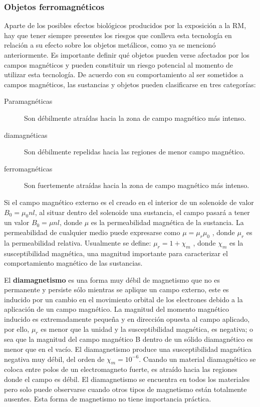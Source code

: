 \subsubsection{Objetos ferromagnéticos}
Aparte de los posibles efectos biológicos producidos por la exposición a la RM, hay que tener siempre presentes los riesgos que conlleva esta tecnología en relación a su efecto sobre los objetos metálicos, como ya se mencionó anteriormente.  Es importante definir qué objetos pueden verse afectados por los campos magnéticos y pueden constituir un riesgo potencial al momento de utilizar esta tecnología. De acuerdo con su comportamiento al ser sometidos a campos magnéticos, las sustancias y objetos pueden clasificarse en tres categorías:
\begin{description}
 \item [Paramagnéticas] Son débilmente atraídas hacia la zona de campo magnético más intenso.
 \item [diamagnéticas] Son débilmente repelidas hacia las regiones de menor campo magnético. 
 \item [ferromagnéticas] Son fuertemente atraídas hacia la zona de campo magnético más intenso. 
\end{description}



Si el campo magnético externo es el creado en el interior de un solenoide de valor $B_0 = \mu_0 nl$, al situar dentro del solenoide una sustancia, el campo pasará a tener un valor $B_0 = \mu nl$, donde $\mu$ es la permeabilidad magnética de la sustancia. La permeabilidad de cualquier medio puede expresarse como $\mu = \mu_r \mu_0$ , donde $\mu_r$ es la permeabilidad relativa. Usualmente se define: $\mu_r = 1 + \chi_m$ , donde $\chi_m$ es la susceptibilidad magnética, una magnitud importante para caracterizar el comportamiento magnético de las sustancias.

El \textbf{diamagnetismo} es una forma muy débil de magnetismo que no es permanente y persiste sólo mientras se aplique un campo externo, este es inducido por un cambio en el movimiento orbital de los electrones debido a la aplicación de un campo magnético. La magnitud del momento magnético inducido es extremadamente pequeña y en dirección opuesta al campo aplicado, por ello, $\mu_r$ es menor que la unidad y la susceptibilidad magnética, es negativa; o sea que la magnitud del campo magnético B dentro de un sólido diamagnético es menor que en el vacío. El diamagnetismo produce una susceptibilidad magnética negativa muy débil, del orden de $\chi_m = 10^{-6}$.  Cuando un material diamagnético se coloca entre polos de un electromagneto fuerte, es atraído hacia las regiones donde el campo es débil. El diamagnetismo se encuentra en todos los materiales pero solo puede observarse cuando otros tipos de magnetismo están totalmente ausentes. Esta forma de magnetismo no tiene importancia práctica.

